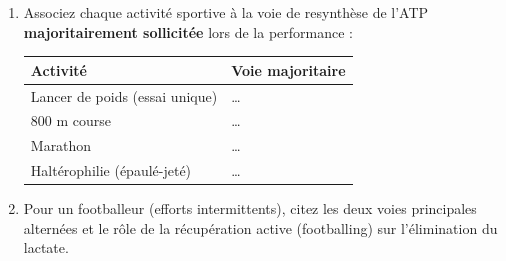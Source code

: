 \documentclass[11pt]{article}
\begin{document}
\begin{exercice}
\begin{enumerate}
    \item Associez chaque activité sportive à la voie de resynthèse de l'ATP \textbf{majoritairement sollicitée} lors de la performance :
    \begin{tabular}{|l|l|}
        \hline
        \textbf{Activité} & \textbf{Voie majoritaire} \\
        \hline
        Lancer de poids (essai unique) & \dots \\
        \hline
        800 m course & \dots \\
        \hline
        Marathon & \dots \\
        \hline
        Haltérophilie (épaulé-jeté) & \dots \\
        \hline
    \end{tabular}
    \item Pour un footballeur (efforts intermittents), citez les deux voies principales alternées et le rôle de la récupération active (footballing) sur l'élimination du lactate.
\end{enumerate}
\end{exercice}
\end{document}
